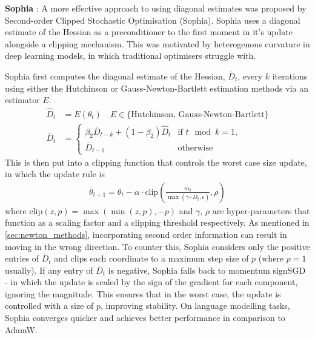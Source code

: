 \textbf{Sophia} : A more effective approach to using diagonal estimates was proposed by Second-order Clipped Stochastic Optimisation (Sophia). Sophia uses a diagonal estimate of the Hessian as a preconditioner to the first moment in it's update alongside a clipping mechanism. This was motivated by heterogenous curvature in deep learning models, in which traditional optimisers struggle with. 

Sophia first computes the diagonal estimate of the Hessian, $\bar{D}_t$, every $k$ iterations using either the Hutchinson or Gauss-Newton-Bartlett estimation methods via an estimator $E$. 
\begin{align}
    \hat{D}_t &= E(\theta_t) \quad E \in \{\text{Hutchinson, Gauss-Newton-Bartlett} \} \\
    \bar{D}_t &= 
    \begin{cases}
        \beta_2 \bar{D}_{t-k} + (1 - \beta_2) \hat{D}_t & \text{if } t \mod k = 1, \\
        \bar{D}_{t-1} & \text{otherwise}
    \end{cases}
\end{align}
This is then put into a clipping function that controls the worst case size update, in which the update rule is
\begin{align}
    \theta_{t+1} = \theta_t - \alpha \cdot \text{clip}(\frac{m_t}{\max(\gamma \cdot \bar{D}_t, \epsilon)}, \rho)
\end{align}
where $\text{clip}(z, p) = \max(\min(z, p), -p)$ and $\gamma$, $\rho$ are hyper-parameters that function as a scaling factor and a clipping threshold respectively. As mentioned in \cref{sec:newton_methods}, incorporating second order information can result in moving in the wrong direction. To counter this, Sophia considers only the positive entries of $\bar{D}_t$ and clips each coordinate to a maximum step size of $p$ (where $p = 1$ usually). If any entry of $\bar{D}_t$ is negative, Sophia falls back to momentum signSGD - in which the update is scaled by the sign of the gradient for each component, ignoring the magnitude. This ensures that in the worst case, the update is controlled with a size of $p$, improving stability. On language modelling tasks, Sophia converges quicker and achieves better performance in comparison to AdamW.

